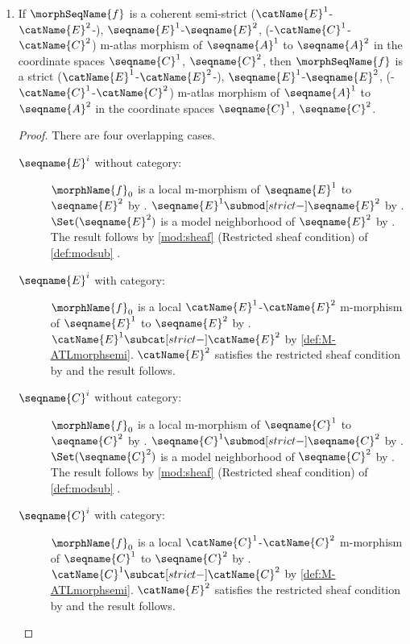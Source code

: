 \documentclass{article}
\begin{document}
\begin{lemma}
\begin{enumerate}
\begin{proof}
\begin{description}
\end{description}
\end{proof}

\item
\label{M-ATLmorph:strictSstrictisstrict}
If $\morphSeqName{f}$ is a coherent semi-strict
\nobreaks
  {
    {($\catName{E}^1$-$\catName{E}^2$-)},
    {$\seqname{E}^1$-$\seqname{E}^2$},
    {(-$\catName{C}^1$-$\catName{C}^2$)}
  }
m-atlas morphism of $\seqname{A}^1$ to $\seqname{A}^2$ in the
coordinate spaces $\seqname{C}^1$, $\seqname{C}^2$, then
$\morphSeqName{f}$ is a strict
\nobreaks
  {
    {($\catName{E}^1$-$\catName{E}^2$-)},
    {$\seqname{E}^1$-$\seqname{E}^2$},
    {(-$\catName{C}^1$-$\catName{C}^2$)}
  }
m-atlas morphism of $\seqname{A}^1$ to $\seqname{A}^2$ in the
coordinate spaces $\seqname{C}^1$, $\seqname{C}^2$.

\begin{proof}
There are four overlapping cases.
\begin{description}
\item[$\seqname{E}^i$ without category:]
\leavevmode
$\morphName{f}_0$ is a local m-morphism of $\seqname{E}^1$ to
$\seqname{E}^2$ by .
$\seqname{E}^1 \submod[strict-] \seqname{E}^2$ by .
$\Set(\seqname{E}^2)$ is a model neighborhood of $\seqname{E}^2$ by .
The result follows by \cref{mod:sheaf} (Restricted sheaf condition) of
{
  \showlabelsinline
  \cref{def:modsub}
}.

\item[$\seqname{E}^i$ with category:]
\leavevmode
$\morphName{f}_0$ is a local $\catName{E}^1$-$\catName{E}^2$ m-morphism
of $\seqname{E}^1$ to $\seqname{E}^2$ by .
$\catName{E}^1 \subcat[strict-] \catName{E}^2$ by
\cref{def:M-ATLmorphsemi}.  $\catName{E}^2$ satisfies the restricted
sheaf condition by  and the result follows.

\item[$\seqname{C}^i$ without category:]
\leavevmode
$\morphName{f}_0$ is a local m-morphism of $\seqname{C}^1$ to
$\seqname{C}^2$ by .
$\seqname{C}^1 \submod[strict-] \seqname{C}^2$ by .
$\Set(\seqname{C}^2)$ is a model neighborhood of $\seqname{C}^2$ by .
The result follows by \cref{mod:sheaf} (Restricted sheaf condition) of
{
  \showlabelsinline
  \cref{def:modsub}
}.

\item[$\seqname{C}^i$ with category:]
\leavevmode
$\morphName{f}_0$ is a local $\catName{C}^1$-$\catName{C}^2$ m-morphism
of $\seqname{C}^1$ to $\seqname{C}^2$ by .
$\catName{C}^1 \subcat[strict-] \catName{C}^2$ by
\cref{def:M-ATLmorphsemi}.  $\catName{E}^2$ satisfies the restricted
sheaf condition by  and the result follows.
\end{description}
\end{proof}


\end{enumerate}
\end{lemma}
\end{document}
